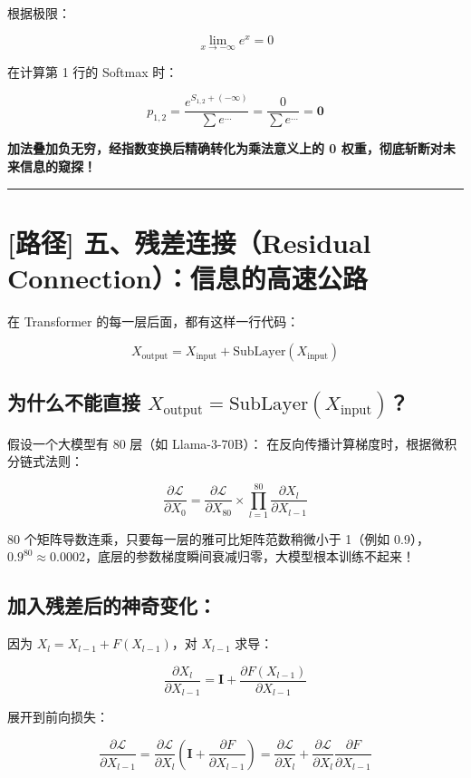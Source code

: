 根据极限：

\[
\lim_{x \to -\infty} e^x = 0
\]

在计算第 1 行的 Softmax 时：

\[
p_{1, 2} = \frac{e^{S_{1, 2} + (-\infty)}}{\sum e^{\dots}} = \frac{0}{\sum e^{\dots}} = \mathbf{0}
\]

\textbf{加法叠加负无穷，经指数变换后精确转化为乘法意义上的 0 权重，彻底斩断对未来信息的窥探！}

\vspace{0.8em}\hrule\vspace{0.8em}

\section{[路径] 五、残差连接（Residual Connection）：信息的高速公路}

在 Transformer 的每一层后面，都有这样一行代码：

\[
X_{\text{output}} = X_{\text{input}} + \text{SubLayer}(X_{\text{input}})
\]

\subsection{为什么不能直接 $X_{\text{output}} = \text{SubLayer}(X_{\text{input}})$？}

假设一个大模型有 80 层（如 Llama-3-70B）：
在反向传播计算梯度时，根据微积分链式法则：

\[
\frac{\partial \mathcal{L}}{\partial X_0} = \frac{\partial \mathcal{L}}{\partial X_{80}} \times \prod_{l=1}^{80} \frac{\partial X_l}{\partial X_{l-1}}
\]

80 个矩阵导数连乘，只要每一层的雅可比矩阵范数稍微小于 1（例如 0.9），$0.9^{80} \approx 0.0002$，底层的参数梯度瞬间衰减归零，大模型根本训练不起来！

\subsection{加入残差后的神奇变化：}

因为 $X_l = X_{l-1} + F(X_{l-1})$，对 $X_{l-1}$ 求导：

\[
\frac{\partial X_l}{\partial X_{l-1}} = \mathbf{I} + \frac{\partial F(X_{l-1})}{\partial X_{l-1}}
\]

展开到前向损失：

\[
\frac{\partial \mathcal{L}}{\partial X_{l-1}} = \frac{\partial \mathcal{L}}{\partial X_l} \left( \mathbf{I} + \frac{\partial F}{\partial X_{l-1}} \right) = \frac{\partial \mathcal{L}}{\partial X_l} + \frac{\partial \mathcal{L}}{\partial X_l} \frac{\partial F}{\partial X_{l-1}}
\]

